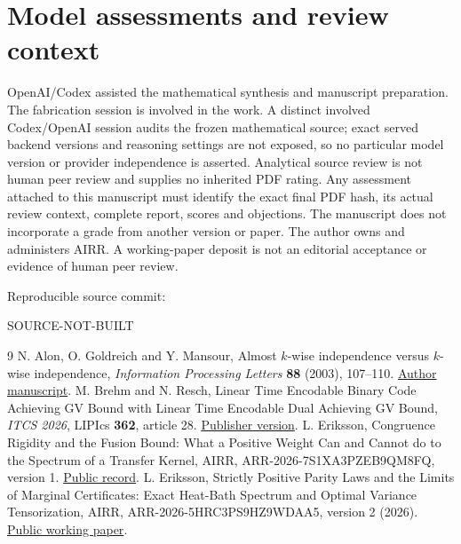 \documentclass[11pt]{article}
\providecommand{\SourceCommit}{SOURCE-NOT-BUILT}
\begin{document}
\section*{Model assessments and review context}
OpenAI/Codex assisted the mathematical synthesis and manuscript preparation.
The fabrication session is involved in the work. A distinct involved
Codex/OpenAI session audits the frozen mathematical source; exact served
backend versions and reasoning settings are not exposed, so no particular
model version or provider independence is asserted. Analytical source
review is not human peer review and supplies no inherited PDF rating.
Any assessment attached to this manuscript must identify the exact final
PDF hash, its actual review context, complete report, scores and objections.
The manuscript does not incorporate a grade from another version or paper.
The author owns and administers AIRR. A working-paper deposit is not an
editorial acceptance or evidence of human peer review.

\smallskip\noindent
Reproducible source commit:\par\noindent
{\small\ttfamily\SourceCommit}

\begin{thebibliography}{9}
N. Alon, O. Goldreich and Y. Mansour,
Almost $k$-wise independence versus $k$-wise independence,
\emph{Information Processing Letters} \textbf{88} (2003), 107--110.
\href{https://www.wisdom.weizmann.ac.il/~oded/PSX/agm.pdf}{Author manuscript}.
M. Brehm and N. Resch,
Linear Time Encodable Binary Code Achieving GV Bound with Linear Time
Encodable Dual Achieving GV Bound,
\emph{ITCS 2026}, LIPIcs \textbf{362}, article 28.
\href{https://doi.org/10.4230/LIPIcs.ITCS.2026.28}{Publisher version}.
L. Eriksson,
Congruence Rigidity and the Fusion Bound: What a Positive Weight Can and
Cannot do to the Spectrum of a Transfer Kernel,
AIRR, ARR-2026-7S1XA3PZEB9QM8FQ, version 1.
\href{https://airr.science/papers/ARR-2026-7S1XA3PZEB9QM8FQ/versions/v1/}{Public record}.
L. Eriksson,
Strictly Positive Parity Laws and the Limits of Marginal Certificates:
Exact Heat-Bath Spectrum and Optimal Variance Tensorization,
AIRR, ARR-2026-5HRC3PS9HZ9WDAA5, version 2 (2026).
\href{https://airr.science/papers/ARR-2026-5HRC3PS9HZ9WDAA5/versions/v2/}{Public working paper}.
\end{thebibliography}
\end{document}
